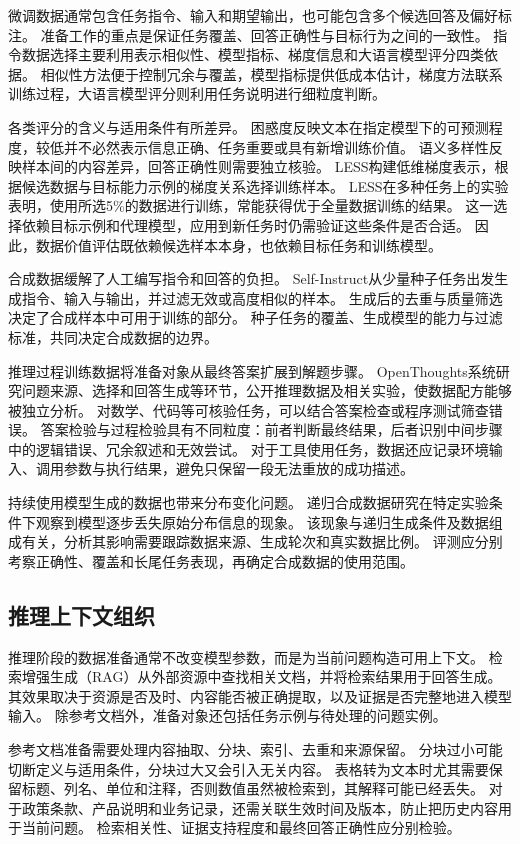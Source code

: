 微调数据通常包含任务指令、输入和期望输出，也可能包含多个候选回答及偏好标注。
准备工作的重点是保证任务覆盖、回答正确性与目标行为之间的一致性。
指令数据选择主要利用表示相似性、模型指标、梯度信息和大语言模型评分四类依据。
相似性方法便于控制冗余与覆盖，模型指标提供低成本估计，梯度方法联系训练过程，大语言模型评分则利用任务说明进行细粒度判断。

各类评分的含义与适用条件有所差异。
困惑度反映文本在指定模型下的可预测程度，较低并不必然表示信息正确、任务重要或具有新增训练价值。
语义多样性反映样本间的内容差异，回答正确性则需要独立核验。
LESS构建低维梯度表示，根据候选数据与目标能力示例的梯度关系选择训练样本。\cite{less}
LESS在多种任务上的实验表明，使用所选5\%的数据进行训练，常能获得优于全量数据训练的结果。\cite{less}
这一选择依赖目标示例和代理模型，应用到新任务时仍需验证这些条件是否合适。
因此，数据价值评估既依赖候选样本本身，也依赖目标任务和训练模型。

合成数据缓解了人工编写指令和回答的负担。
Self-Instruct从少量种子任务出发生成指令、输入与输出，并过滤无效或高度相似的样本。\cite{selfinstruct}
生成后的去重与质量筛选决定了合成样本中可用于训练的部分。
种子任务的覆盖、生成模型的能力与过滤标准，共同决定合成数据的边界。

推理过程训练数据将准备对象从最终答案扩展到解题步骤。
OpenThoughts系统研究问题来源、选择和回答生成等环节，公开推理数据及相关实验，使数据配方能够被独立分析。\cite{openthoughts}
对数学、代码等可核验任务，可以结合答案检查或程序测试筛查错误。
答案检验与过程检验具有不同粒度：前者判断最终结果，后者识别中间步骤中的逻辑错误、冗余叙述和无效尝试。
对于工具使用任务，数据还应记录环境输入、调用参数与执行结果，避免只保留一段无法重放的成功描述。

持续使用模型生成的数据也带来分布变化问题。
递归合成数据研究在特定实验条件下观察到模型逐步丢失原始分布信息的现象。\cite{collapse}
该现象与递归生成条件及数据组成有关，分析其影响需要跟踪数据来源、生成轮次和真实数据比例。
评测应分别考察正确性、覆盖和长尾任务表现，再确定合成数据的使用范围。

\subsection{推理上下文组织}

推理阶段的数据准备通常不改变模型参数，而是为当前问题构造可用上下文。
检索增强生成（RAG）从外部资源中查找相关文档，并将检索结果用于回答生成。\cite{rag}
其效果取决于资源是否及时、内容能否被正确提取，以及证据是否完整地进入模型输入。
除参考文档外，准备对象还包括任务示例与待处理的问题实例。

参考文档准备需要处理内容抽取、分块、索引、去重和来源保留。
分块过小可能切断定义与适用条件，分块过大又会引入无关内容。
表格转为文本时尤其需要保留标题、列名、单位和注释，否则数值虽然被检索到，其解释可能已经丢失。
对于政策条款、产品说明和业务记录，还需关联生效时间及版本，防止把历史内容用于当前问题。
检索相关性、证据支持程度和最终回答正确性应分别检验。

